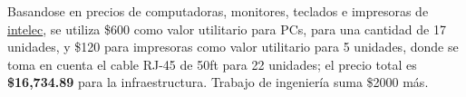     Basandose en precios de computadoras, monitores, teclados e
    impresoras de \href{https://www.intelec.co.cr/computadoras-gaming/}{intelec},
    se utiliza \$600 como valor utilitario para PCs, para una
    cantidad de 17 unidades, y \$120 para impresoras como valor
    utilitario para 5 unidades, donde se toma en cuenta
    el cable RJ-45 de 50ft para 22 unidades; el precio
    total es {\bf \$16,734.89} para la infraestructura.
    Trabajo de ingeniería suma \$2000 más.
